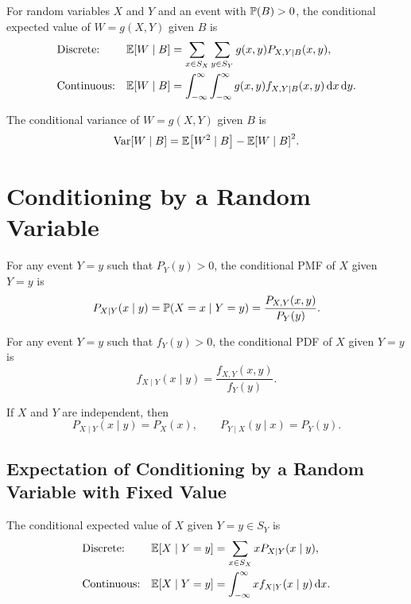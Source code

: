 \begin{definition}
    For random variables $X$ and $Y$ and an event with $\P{B}>0$, the conditional expected value of $W=g(X,Y)$ given $B$ is
    \begin{align*}
        &\text{Discrete:}& \E{W\mid B}&=\sum_{x\in S_X}\sum_{y\in S_Y}g(x,y)P_{X,Y\mid B}(x,y), \\
        &\text{Continuous:}& \E{W\mid B}&=\int_{-\infty}^{\infty}\int_{-\infty}^{\infty}g(x,y)f_{X,Y\mid B}(x,y)\diff x\diff y.
    \end{align*}
\end{definition}

\begin{theorem}
    The conditional variance of $W=g(X,Y)$ given $B$ is
    \[\Var[W\mid B]=\E{W^2\mid B}-\E{W\mid B}^2.\]
\end{theorem}

\section{Conditioning by a Random Variable}
\begin{definition}
    For any event $Y=y$ such that $P_Y(y)>0$, the conditional \textnormal{PMF} of $X$ given $Y=y$ is
    \[P_{X\mid Y}(x\mid y)=\condP{X=x}{Y=y}=\frac{P_{X,Y}(x,y)}{P_Y(y)}.\]
\end{definition}

\begin{definition}
    \label{def:conditional_pdf}
    For any event $Y=y$ such that $f_Y(y)>0$, the conditional \textnormal{PDF} of $X$ given $Y=y$ is
    \[f_{X\mid Y}(x\mid y)=\frac{f_{X,Y}(x,y)}{f_Y(y)}.\]
\end{definition}

\begin{theorem}
    If $X$ and $Y$ are independent, then
    \[P_{X\mid Y}(x\mid y)=P_X(x), \qquad P_{Y\mid X}(y\mid x)=P_Y(y).\]
\end{theorem}

\subsection{Expectation of Conditioning by a Random Variable with Fixed Value}
\begin{definition}
    \label{def:conditional_expected_value}
    The conditional expected value of $X$ given $Y=y\in S_Y$ is
    \begin{align*}
        &\text{Discrete:}& \E{X\mid Y=y}&=\sum_{x\in S_X}xP_{X\mid Y}(x\mid y), \\
        &\text{Continuous:}& \E{X\mid Y=y}&=\int_{-\infty}^{\infty}xf_{X\mid Y}(x\mid y)\diff x.
    \end{align*}
\end{definition}

